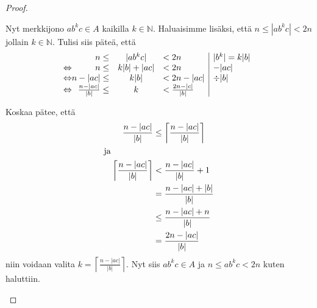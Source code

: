 \documentclass[a4paper,11pt,draft]{article}
\newcommand{\ceil}[1]{{\left\lceil#1\right\rceil}}
\begin{document}
\begin{enumerate}
\begin{enumerate}
\begin{proof}
\begin{description}
          Nyt merkkijono $ab^kc \in A$ kaikilla $k \in \mathbb{N}$.
          Haluaisimme lisäksi, että $n \le |ab^kc| < 2n$ jollain $k
          \in \mathbb{N}$. Tulisi siis päteä, että
          \begin{equation*}
          \begin{array}{@{}r@{}rcl|l}
            & n \le & |ab^kc| & < 2n & |b^k| = k|b| \\
            \Leftrightarrow
            & n \le & k|b| + |ac| & < 2n & -|ac| \\
            \Leftrightarrow
            & n - |ac| \le & k|b| & < 2n - |ac| & \div |b| \\
            \Leftrightarrow &
            \frac{n - |ac|}{|b|} \le & k & < \frac{2n - |c|}{|b|} \\
          \end{array}
          \end{equation*}

          Koskaa pätee, että
          \begin{align*}
            \frac{n - |ac|}{|b|} & \le \ceil{\frac{n - |ac|}{|b|}} \\
            \intertext{ja}\quad
            \ceil{\frac{n - |ac|}{|b|}}
            & < \frac{n - |ac|}{|b|} + 1 \\
            & = \frac{n - |ac| + |b|}{|b|} \\
            & \le \frac{n - |ac| + n}{|b|} \\
            & = \frac{2n - |ac|}{|b|}
          \end{align*}
          niin voidaan valita $k = \ceil{\frac{n - |ac|}{|b|}}$. Nyt
          siis $ab^kc \in A$ ja $n \le ab^kc < 2n$ kuten haluttiin.
      \end{description} 
    \end{proof}
\end{enumerate}


\end{enumerate}
\end{document}
